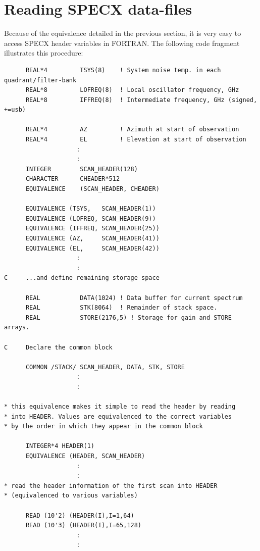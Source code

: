 \documentclass[11pt,twoside]{report}
\begin{document}
\section{Reading SPECX data-files} 

Because of the equivalence detailed in the previous section, it is very easy to
access SPECX header variables in FORTRAN. The following code fragment
illustrates this procedure:

\begin{verbatim}
      REAL*4         TSYS(8)    ! System noise temp. in each quadrant/filter-bank
      REAL*8         LOFREQ(8)  ! Local oscillator frequency, GHz
      REAL*8         IFFREQ(8)  ! Intermediate frequency, GHz (signed, +=usb)

      REAL*4         AZ         ! Azimuth at start of observation
      REAL*4         EL         ! Elevation at start of observation
                    :
                    :
      INTEGER        SCAN_HEADER(128)
      CHARACTER      CHEADER*512
      EQUIVALENCE    (SCAN_HEADER, CHEADER)

      EQUIVALENCE (TSYS,   SCAN_HEADER(1))
      EQUIVALENCE (LOFREQ, SCAN_HEADER(9))
      EQUIVALENCE (IFFREQ, SCAN_HEADER(25))
      EQUIVALENCE (AZ,     SCAN_HEADER(41))
      EQUIVALENCE (EL,     SCAN_HEADER(42))
                    :
                    :
C     ...and define remaining storage space

      REAL           DATA(1024) ! Data buffer for current spectrum
      REAL           STK(8064)  ! Remainder of stack space.
      REAL           STORE(2176,5) ! Storage for gain and STORE arrays.

C     Declare the common block

      COMMON /STACK/ SCAN_HEADER, DATA, STK, STORE
                    :
                    :

* this equivalence makes it simple to read the header by reading
* into HEADER. Values are equivalenced to the correct variables
* by the order in which they appear in the common block

      INTEGER*4 HEADER(1)
      EQUIVALENCE (HEADER, SCAN_HEADER)
                    :
                    :
* read the header information of the first scan into HEADER
* (equivalenced to various variables)

      READ (10'2) (HEADER(I),I=1,64)
      READ (10'3) (HEADER(I),I=65,128)
                    :
                    :
\end{verbatim}
\end{document}

